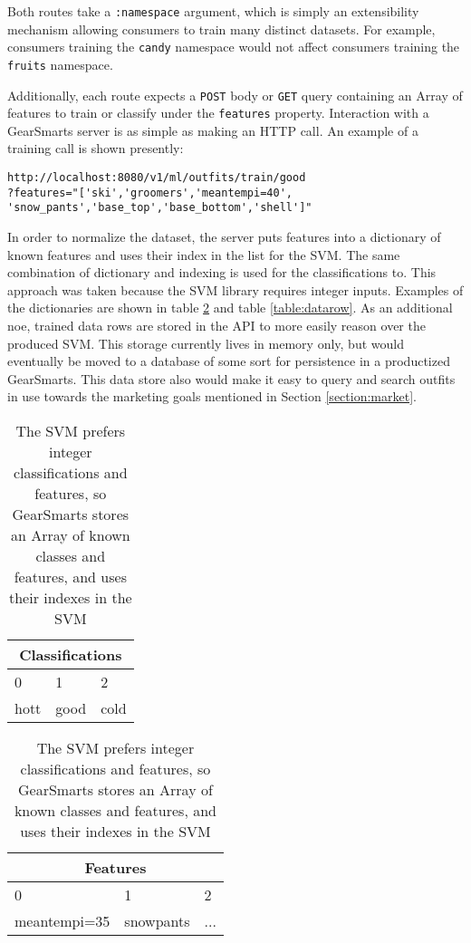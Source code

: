 Both routes take a \texttt{:namespace} argument, which is simply an extensibility mechanism allowing consumers to train
many distinct datasets. For example, consumers training the \texttt{candy} namespace would not affect consumers training
the \texttt{fruits} namespace.

Additionally, each route expects a \texttt{POST} body or \texttt{GET} query containing an Array of features to
train or classify under the \texttt{features} property. Interaction with a GearSmarts server is as simple as
making an HTTP call. An example of a training call is shown presently:

\begin{lstlisting}
http://localhost:8080/v1/ml/outfits/train/good
?features="['ski','groomers','meantempi=40',
'snow_pants','base_top','base_bottom','shell']"
\end{lstlisting}

In order to normalize the dataset, the server puts features into a dictionary of known features and uses their index
in the list for the SVM. The same combination of dictionary and indexing is used for the classifications to. This approach
was taken because the SVM library requires integer inputs. Examples of the dictionaries are shown in table
\ref{table:dictionary} and table \ref{table:datarow}. As an additional noe,
trained data rows are stored in the API to more easily reason over the produced SVM. This storage currently lives in
memory only, but would eventually be moved to a database of some sort for persistence in a productized GearSmarts.
This data store also would make it easy to query and search outfits in use towards the marketing goals mentioned in
Section \ref{section:market}.

\begin{table}
    \begin{tabular}{lll}
        \hline
        \multicolumn{3}{c}{Classifications} \\
        \hline
        0 & 1 & 2 \\
        hott & good & cold \\
        \hline
        \hline
    \end{tabular}
    \begin{tabular}{lll}
        \multicolumn{3}{c}{Features} \\
        \hline
        0 & 1 & 2 \\
        meantempi=35 & snowpants & ... \\
        \hline
    \end{tabular}
    \caption{The SVM prefers integer classifications and features, so GearSmarts stores an Array of known classes and features,
    and uses their indexes in the SVM}
    \label{table:dictionary}
\end{table}

